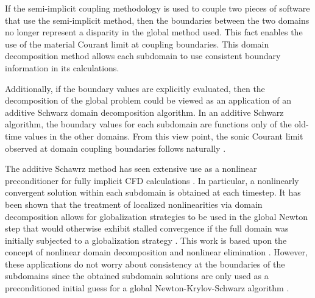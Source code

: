 If the semi-implicit coupling methodology is used to couple two pieces of software that use the semi-implicit method, then the boundaries between the two domains no longer represent a disparity in the global method used.
This fact enables the use of the material Courant limit at coupling boundaries.
This domain decomposition method allows each subdomain to use consistent boundary information in its calculations.

Additionally, if the boundary values are explicitly evaluated, then the decomposition of the global problem could be viewed as an application of an additive Schwarz domain decomposition algorithm.
In an additive Schwarz algorithm, the boundary values for each subdomain are functions only of the old-time values in the other domains.
From this view point, the sonic Courant limit observed at domain coupling boundaries follows naturally \cite{Aumiller2001}.

The additive Schawrz method has seen extensive use as a nonlinear preconditioner for fully implicit CFD calculations \cite{Cai2009, Cai2002}.
In particular, a nonlinearly convergent solution within each subdomain is obtained at each timestep.
It has been shown that the treatment of localized nonlinearities via domain decomposition allows for globalization strategies to be used in the global Newton step that would otherwise exhibit stalled convergence if the full domain was initially subjected to a globalization strategy \cite{Cai2011}.
This work is based upon the concept of nonlinear domain decomposition and nonlinear elimination \cite{Lanzkron1996, Dryja1997}.
However, these applications do not worry about consistency at the boundaries of the subdomains since the obtained subdomain solutions are only used as a preconditioned initial guess for a global Newton-Krylov-Schwarz algorithm \cite{Chan1984}.


